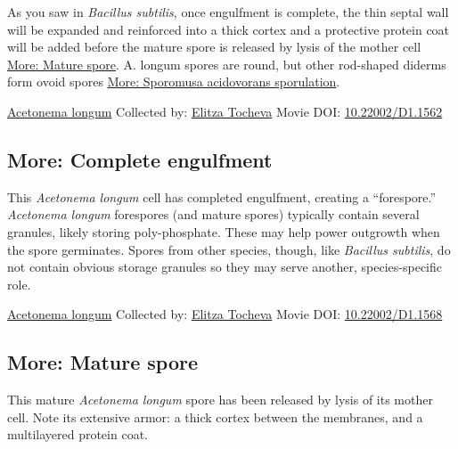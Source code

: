 \documentclass[]{tufte-book}
\begin{document}
As you saw in \emph{Bacillus subtilis}, once engulfment is complete, the thin septal wall will be expanded and reinforced into a thick cortex and a protective protein coat will be added before the mature spore is released by lysis of the mother cell \protect\hyperlink{Mature_spore}{More: Mature spore}. A. longum spores are round, but other rod-shaped diderms form ovoid spores \protect\hyperlink{Sporomusa_acidovorans_sporulation}{More: Sporomusa acidovorans sporulation}.



\hypertarget{htmlwidget-49307ac9fe69b08c43bf}{}

\label{fig:8-10}\protect\hyperlink{tree}{Acetonema longum} Collected by: \protect\hyperlink{elitza_tocheva}{Elitza Tocheva} Movie DOI: \href{https://doi.org/10.22002/D1.1562}{10.22002/D1.1562}

\hypertarget{Complete_engulfment}{%
\subsection*{More: Complete engulfment}\label{Complete_engulfment}}

This \emph{Acetonema longum} cell has completed engulfment, creating a ``forespore.'' \emph{Acetonema longum} forespores (and mature spores) typically contain several granules, likely storing poly-phosphate. These may help power outgrowth when the spore germinates. Spores from other species, though, like \emph{Bacillus subtilis}, do not contain obvious storage granules so they may serve another, species-specific role.



\hypertarget{htmlwidget-4f924f0633178262c896}{}

\label{fig:8-10a}\protect\hyperlink{tree}{Acetonema longum} Collected by: \protect\hyperlink{elitza_tocheva}{Elitza Tocheva} Movie DOI: \href{https://doi.org/10.22002/D1.1568}{10.22002/D1.1568}

\hypertarget{Mature_spore}{%
\subsection*{More: Mature spore}\label{Mature_spore}}

This mature \emph{Acetonema longum} spore has been released by lysis of its mother cell. Note its extensive armor: a thick cortex between the membranes, and a multilayered protein coat.
\end{document}
